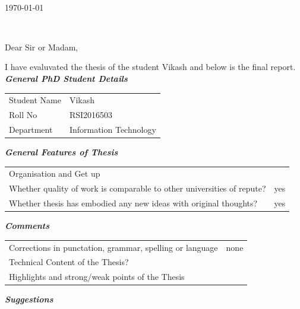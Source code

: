 \documentclass[11pt,a4paper]{letter} %
\def\opening#1{\thispagestyle{empty}
{\centering\fromaddress \vspace{0.6in} \\ %
\hspace*{\longindentation}\today\hspace*{\fill}\par} %
{\raggedright \toname \\ \toaddress \par} %
\vspace{0.4in} %
\noindent #1 %
}
\begin{document}

\begin{letter}
{ }


\opening{Dear Sir or Madam,}

I have evaluvated the thesis of the student Vikash   and below is the final report. \\ 

\textbf{\textit{ General PhD Student Details}}
\begin{center}
    \begin{tabular}{  p{5cm}  p{8cm} }
    Student Name & Vikash   \\  
    Roll No &  RSI2016503 \\  
    Department &  Information Technology\\ 
    \end{tabular}
\end{center} 
\hspace{1.1cm}\textbf{\textit{General Features of Thesis}}
\begin{center}
    \begin{tabular}{  p{5cm}  p{8cm} }
   Organisation and Get up &  \\
   Whether quality of work is comparable to other universities of repute? & yes \\
   Whether thesis has embodied any new ideas with original thoughts? & yes \\
    \end{tabular}
\end{center}
\break
\hspace{1.1cm}\textbf{\textit{Comments}}
\begin{center}
    \begin{tabular}{  p{5cm}  p{8cm} }
   Corrections in punctation, grammar, spelling or language & none \\
   Technical Content of the Thesis? &  \\
    Highlights and strong/weak points of the Thesis &  \\
    \end{tabular}
\end{center}
\hspace{1.1cm}\textbf{\textit{Suggestions}}
\begin{center}
     \begin{tabular}{  p{13.5cm}  }
  

\end{tabular}
\end{center}
\end{letter}
\end{document}
